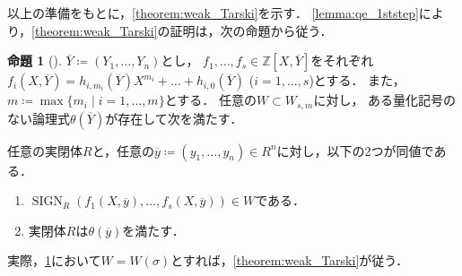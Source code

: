 \documentclass[uplatex, dvipdfmx]{jsarticle}
\numberwithin{equation}{section}
\newcommand{\Z}{\mathbb{Z}}
\DeclareMathOperator{\SIGN}{SIGN}
\theoremstyle{definition}
\newtheorem{proposition}[definition]{命題}
\begin{document}
以上の準備をもとに，\cref{theorem:weak_Tarski}を示す．
\cref{lemma:qe_1ststep}により，\cref{theorem:weak_Tarski}の証明は，次の命題から従う．

\begin{proposition}[{\cite[Proposition 1.4.6]{MR1659509}}] \label{proposition:weak_Tarski}
     $\overline{Y}\coloneqq (Y_1, \dots, Y_n)$とし，
     $f_1, \dots, f_s \in \Z\left[X, \overline{Y}\right]$をそれぞれ
     $f_i \left(X, \overline{Y} \right) = h_{i, m_i}\left( \overline{Y} \right) X^{m_i} + \dots + h_{i, 0}\left(\overline{Y}\right)$ ($i=1, \dots, s$)とする．
     また，$m\coloneqq \max\{m_i \mid i=1, \dots, m\}$とする．
     任意の$W \subset W_{s,m}$に対し，
     ある量化記号のない論理式$\theta\left(\overline{Y}\right)$が存在して次を満たす．

     任意の実閉体$R$と，任意の$\overline{y} \coloneqq (y_1, \dots, y_n) \in R^n$に対し，以下の2つが同値である．
     \begin{enumerate}
          \item $\SIGN_R(f_1(X, \overline{y}), \dots, f_s(X, \overline{y})) \in W$である．
          \item 実閉体$R$は$\theta(\overline{y})$を満たす．
     \end{enumerate}
\end{proposition}

実際，\cref{proposition:weak_Tarski}において$W=W(\sigma)$とすれば，\cref{theorem:weak_Tarski}が従う．
\end{document}
